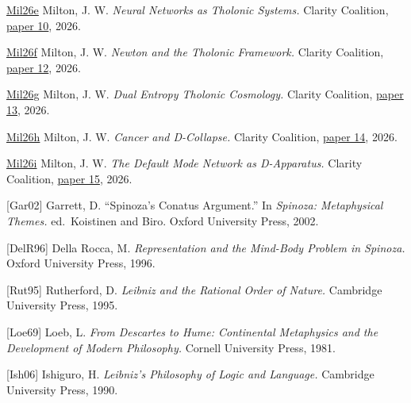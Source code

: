 \documentclass[12pt]{article}
\begin{document}
\href{https://github.com/baardev/truevalue/blob/main/docnav/Research/papers/10_tholonic-neural-architecture/10_tholonic-neural-architecture.pdf}{Mil26e}
Milton, J. W. \emph{Neural Networks as Tholonic Systems.} Clarity
Coalition,
\href{https://github.com/baardev/truevalue/blob/main/docnav/Research/papers/10_tholonic-neural-architecture/10_tholonic-neural-architecture.pdf}{paper
10}, 2026.

\href{https://github.com/baardev/truevalue/blob/main/docnav/Research/papers/12_newton-tholonic-framework/12_newton-tholonic-framework.pdf}{Mil26f}
Milton, J. W. \emph{Newton and the Tholonic Framework.} Clarity
Coalition,
\href{https://github.com/baardev/truevalue/blob/main/docnav/Research/papers/12_newton-tholonic-framework/12_newton-tholonic-framework.pdf}{paper
12}, 2026.

\href{https://github.com/baardev/truevalue/blob/main/docnav/Research/papers/13_dual-entropy-tholonic-cosmology/13_dual-entropy-tholonic-cosmology.pdf}{Mil26g}
Milton, J. W. \emph{Dual Entropy Tholonic Cosmology.} Clarity Coalition,
\href{https://github.com/baardev/truevalue/blob/main/docnav/Research/papers/13_dual-entropy-tholonic-cosmology/13_dual-entropy-tholonic-cosmology.pdf}{paper
13}, 2026.

\href{https://github.com/baardev/truevalue/blob/main/docnav/Research/papers/14_cancer-d-collapse/14_cancer-d-collapse.pdf}{Mil26h}
Milton, J. W. \emph{Cancer and D-Collapse.} Clarity Coalition,
\href{https://github.com/baardev/truevalue/blob/main/docnav/Research/papers/14_cancer-d-collapse/14_cancer-d-collapse.pdf}{paper
14}, 2026.

\href{https://github.com/baardev/truevalue/blob/main/docnav/Research/papers/15_consciousness-dmn-d-apparatus/15_consciousness-dmn-d-apparatus.pdf}{Mil26i}
Milton, J. W. \emph{The Default Mode Network as D-Apparatus.} Clarity
Coalition,
\href{https://github.com/baardev/truevalue/blob/main/docnav/Research/papers/15_consciousness-dmn-d-apparatus/15_consciousness-dmn-d-apparatus.pdf}{paper
15}, 2026.

{[}Gar02{]} Garrett, D. ``Spinoza's Conatus Argument.'' In
\emph{Spinoza: Metaphysical Themes.} ed.~Koistinen and Biro. Oxford
University Press, 2002.

{[}DelR96{]} Della Rocca, M. \emph{Representation and the Mind-Body
Problem in Spinoza.} Oxford University Press, 1996.

{[}Rut95{]} Rutherford, D. \emph{Leibniz and the Rational Order of
Nature.} Cambridge University Press, 1995.

{[}Loe69{]} Loeb, L. \emph{From Descartes to Hume: Continental
Metaphysics and the Development of Modern Philosophy.} Cornell
University Press, 1981.

{[}Ish06{]} Ishiguro, H. \emph{Leibniz's Philosophy of Logic and
Language.} Cambridge University Press, 1990.
\end{document}
